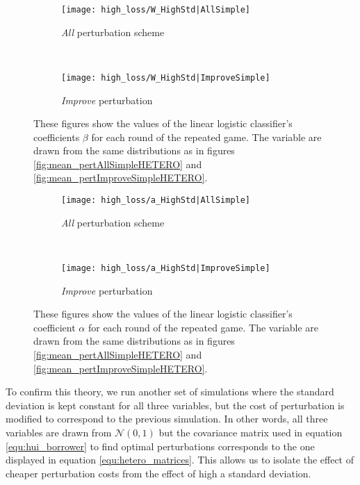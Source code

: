 \documentclass[12pt]{article} %
\begin{document}
\begin{figure*}[t!]
    \centering
    \begin{subfigure}{0.5\textwidth}
        \centering
        \texttt{[image: high\_loss/W\_HighStd|AllSimple]}
        \caption{\textit{All} perturbation scheme}
        \label{fig:high_std_beta_all}
    \end{subfigure}%
    ~ 
    \begin{subfigure}{0.5\textwidth}
        \centering
        \texttt{[image: high\_loss/W\_HighStd|ImproveSimple]}
            \caption{\textit{Improve} perturbation}
        \label{fig:high_std_beta_improve}
    \end{subfigure}
    \caption{These figures show the values of the linear logistic classifier's coefficients $\beta$ for each round of the repeated game. The variable are drawn from the same distributions as in figures \ref{fig:mean_pertAllSimpleHETERO} and \ref{fig:mean_pertImproveSimpleHETERO}.}
\end{figure*}

\begin{figure*}[t!]
    \centering
    \begin{subfigure}{0.5\textwidth}
        \centering
        \texttt{[image: high\_loss/a\_HighStd|AllSimple]}
        \caption{\textit{All} perturbation scheme}
        \label{fig:high_std_alpha_all}
    \end{subfigure}%
    ~ 
    \begin{subfigure}{0.5\textwidth}
        \centering
        \texttt{[image: high\_loss/a\_HighStd|ImproveSimple]}
            \caption{\textit{Improve} perturbation}
        \label{fig:high_std_alpha_improve}
    \end{subfigure}
    \caption{These figures show the values of the linear logistic classifier's coefficient $\alpha$ for each round of the repeated game. The variable are drawn from the same distributions as in figures \ref{fig:mean_pertAllSimpleHETERO} and \ref{fig:mean_pertImproveSimpleHETERO}.}
\end{figure*}

To confirm this theory, we run another set of simulations where the standard deviation is kept constant for all three variables, but the cost of perturbation is modified to correspond to the previous simulation. In other words, all three variables are drawn from $\mathcal{N}(0,1)$ but the covariance matrix used in equation \eqref{equ:hui_borrower} to find optimal perturbations corresponds to the one displayed in equation \eqref{equ:hetero_matrices}. This allows us to isolate the effect of cheaper perturbation costs from the effect of high a standard deviation.
\end{document}
